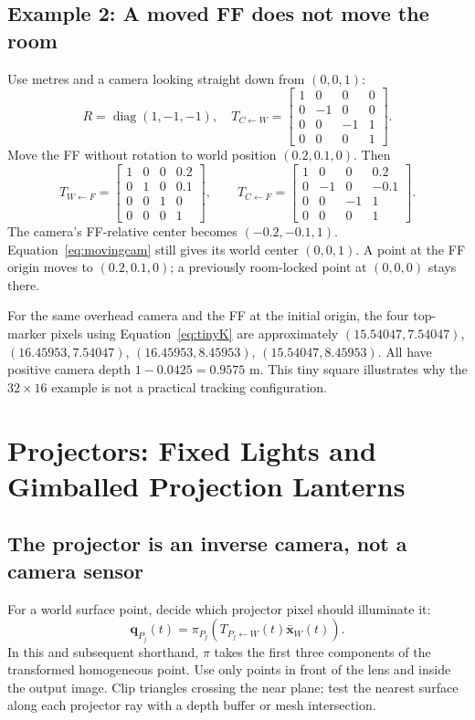 \documentclass[11pt,a4paper]{article}
\newcommand{\T}[2]{T_{#1\leftarrow #2}}
\newcommand{\hpt}[1]{\bar{\bm{x}}_{#1}}
\begin{document}
\subsection{Example 2: A moved FF does not move the room}
Use metres and a camera looking straight down from $(0,0,1)$:
\begin{equation}
R=\operatorname{diag}(1,-1,-1),\quad
\T{C}{W}=
\begin{bmatrix}1&0&0&0\\0&-1&0&0\\0&0&-1&1\\0&0&0&1\end{bmatrix}.
\end{equation}
Move the FF without rotation to world position $(0.2,0.1,0)$.
Then
\begin{equation}
\T{W}{F}=
\begin{bmatrix}1&0&0&0.2\\0&1&0&0.1\\0&0&1&0\\0&0&0&1\end{bmatrix},
\qquad
\T{C}{F}=
\begin{bmatrix}1&0&0&0.2\\0&-1&0&-0.1\\0&0&-1&1\\0&0&0&1\end{bmatrix}.
\end{equation}
The camera's FF-relative center becomes $(-0.2,-0.1,1)$.
Equation~\eqref{eq:movingcam} still gives its world center $(0,0,1)$.
A point at the FF origin moves to $(0.2,0.1,0)$; a previously room-locked
point at $(0,0,0)$ stays there.

For the same overhead camera and the FF at the initial origin, the four
top-marker pixels using Equation~\eqref{eq:tinyK} are approximately
$(15.54047,7.54047)$, $(16.45953,7.54047)$,
$(16.45953,8.45953)$, $(15.54047,8.45953)$.
All have positive camera depth $1-0.0425=0.9575$ m.
This tiny square illustrates why the $32\times16$ example is not a practical
tracking configuration.

\section{Projectors: Fixed Lights and Gimballed Projection Lanterns}
\label{sec:projectors}

\subsection{The projector is an inverse camera, not a camera sensor}
For a world surface point, decide which projector pixel should illuminate it:
\begin{equation}
\bm{q}_{P_j}(t)=
\pi_{P_j}\!\left(\T{P_j}{W}(t)\hpt{W}(t)\right).
\label{eq:projector}
\end{equation}
In this and subsequent shorthand, $\pi$ takes the first three components
of the transformed homogeneous point.
Use only points in front of the lens and inside the output image.
Clip triangles crossing the near plane; test the nearest surface along
each projector ray with a depth buffer or mesh intersection.
\end{document}
